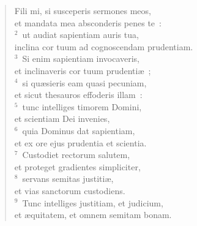 \begin{flushleft}\begin{verse}\vspace{-19pt}Fili mi, si susceperis sermones meos,\\ et mandata mea absconderis penes te~:\\
${}^{2}$~ut audiat sapientiam auris tua,\\ inclina cor tuum ad cognoscendam prudentiam.\\
${}^{3}$~Si enim sapientiam invocaveris,\\ et inclinaveris cor tuum prudenti\ae~;\\
${}^{4}$~si qu\ae sieris eam quasi pecuniam,\\ et sicut thesauros effoderis illam~:\\
${}^{5}$~tunc intelliges timorem Domini,\\ et scientiam Dei invenies,\\
${}^{6}$~quia Dominus dat sapientiam,\\ et ex ore ejus prudentia et scientia.\\
${}^{7}$~Custodiet rectorum salutem,\\ et proteget gradientes simpliciter,\\
${}^{8}$~servans semitas justiti\ae ,\\ et vias sanctorum custodiens.\\
${}^{9}$~Tunc intelliges justitiam, et judicium,\\ et \ae quitatem, et omnem semitam bonam.\end{verse}\end{flushleft}


